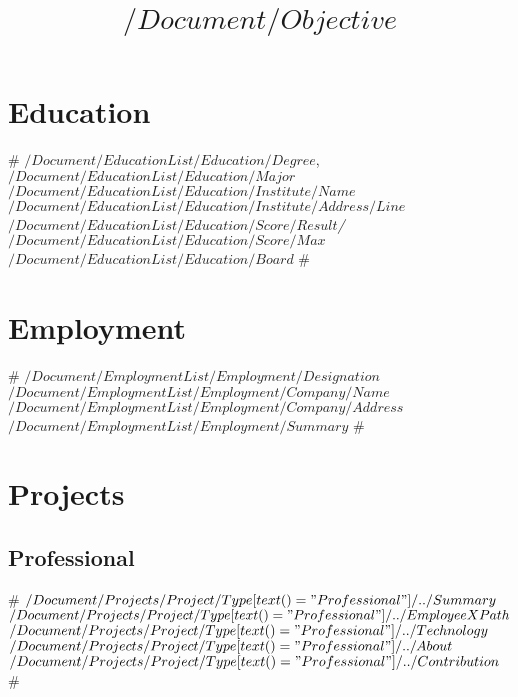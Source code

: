 \documentclass[11pt,a4paper,sans]{moderncv}
\title{$/Document/Objective$}
\begin{document}
\makecvtitle

\section{Education}

#
{$/Document/EducationList/Education/Degree$, $/Document/EducationList/Education/Major$}
{$/Document/EducationList/Education/Institute/Name$}
{$/Document/EducationList/Education/Institute/Address/Line$}
{\textit{$/Document/EducationList/Education/Score/Result$/$/Document/EducationList/Education/Score/Max$}}
{$/Document/EducationList/Education/Board$}  %
#


\section{Employment}
#
{$/Document/EmploymentList/Employment/Designation$}
{$/Document/EmploymentList/Employment/Company/Name$}
{$/Document/EmploymentList/Employment/Company/Address$}
{}
{$/Document/EmploymentList/Employment/Summary$}
#

\section{Projects}
\subsection{Professional}
#
{$/Document/Projects/Project/Type[text()="Professional"]/../Summary$}
{$/Document/Projects/Project/Type[text()="Professional"]/../EmployeeXPath$}
{$/Document/Projects/Project/Type[text()="Professional"]/../Technology$}{}
{$/Document/Projects/Project/Type[text()="Professional"]/../About$\newline{}
$/Document/Projects/Project/Type[text()="Professional"]/../Contribution$}
#
\end{document}
